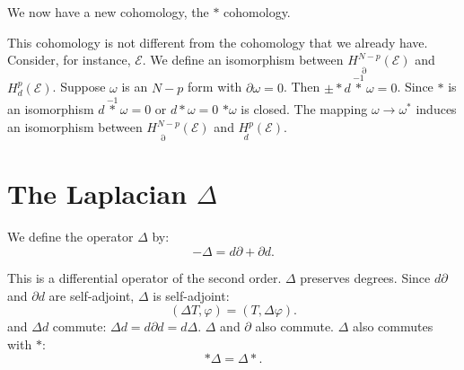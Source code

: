 We now have a new cohomology, the $\ast$ cohomology.

This cohomology is not different from the cohomology that we already
have. Consider, for instance, $\mathscr{E}$. We define an isomorphism
between $\underset{\partial}{H^{N-p}}(\mathscr{E})$ and
$H^{p}_{d}(\mathscr{E})$. Suppose $\omega$ is an $N-p$ form with
$\partial\omega=0$. Then $\pm \ast
d\overset{-1}{\ast}\omega=0$. Since $\ast$ is an isomorphism
$d\overset{-1}{\ast}\omega=0$ or $d\ast \omega=0$ \iec $\ast\omega$ is
closed. The mapping $\omega\to \omega^{\ast}$ induces an isomorphism
between $\underset{\partial}{H^{N-p}}(\mathscr{E})$ and
$\underset{d}{H^{p}}(\mathscr{E})$. 

\section*{The Laplacian $\Delta$}

We define the operator $\Delta$ by:
$$
-\Delta=d\partial +\partial d.
$$

This is a differential operator of the second order. $\Delta$
preserves degrees. Since $d\partial $ and $\partial d$ are
self-adjoint, $\Delta$ is self-adjoint:
$$
(\Delta T,\varphi)=(T,\Delta\varphi).
$$
and $ \Delta d$ commute: $\Delta d=d\partial d=d\Delta$. $\Delta$ and
$\partial$ also commute. $\Delta$ also commutes with $\ast$:
$$
\ast\Delta=\Delta\ast.
$$


